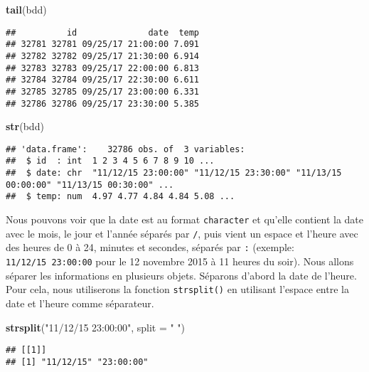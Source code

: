 \documentclass[]{book}
\newenvironment{Shaded}{\begin{snugshade}}{\end{snugshade}}
\newcommand{\KeywordTok}[1]{\textcolor[rgb]{0.13,0.29,0.53}{\textbf{#1}}}
\newcommand{\DataTypeTok}[1]{\textcolor[rgb]{0.13,0.29,0.53}{#1}}
\newcommand{\StringTok}[1]{\textcolor[rgb]{0.31,0.60,0.02}{#1}}
\newcommand{\NormalTok}[1]{#1}
\theoremstyle{definition}
\theoremstyle{definition}
\theoremstyle{definition}
\theoremstyle{remark}
\begin{document}
\begin{Shaded}
\begin{Highlighting}[]
\KeywordTok{tail}\NormalTok{(bdd)}
\end{Highlighting}
\end{Shaded}

\begin{verbatim}
##          id              date  temp
## 32781 32781 09/25/17 21:00:00 7.091
## 32782 32782 09/25/17 21:30:00 6.914
## 32783 32783 09/25/17 22:00:00 6.813
## 32784 32784 09/25/17 22:30:00 6.611
## 32785 32785 09/25/17 23:00:00 6.331
## 32786 32786 09/25/17 23:30:00 5.385
\end{verbatim}

\begin{Shaded}
\begin{Highlighting}[]
\KeywordTok{str}\NormalTok{(bdd)}
\end{Highlighting}
\end{Shaded}

\begin{verbatim}
## 'data.frame':    32786 obs. of  3 variables:
##  $ id  : int  1 2 3 4 5 6 7 8 9 10 ...
##  $ date: chr  "11/12/15 23:00:00" "11/12/15 23:30:00" "11/13/15 00:00:00" "11/13/15 00:30:00" ...
##  $ temp: num  4.97 4.77 4.84 4.84 5.08 ...
\end{verbatim}

Nous pouvons voir que la date est au format \texttt{character} et
qu'elle contient la date avec le mois, le jour et l'année séparés par
\texttt{/}, puis vient un espace et l'heure avec des heures de 0 à 24,
minutes et secondes, séparés par \texttt{:} (exemple:
\texttt{11/12/15\ 23:00:00} pour le 12 novembre 2015 à 11 heures du
soir). Nous allons séparer les informations en plusieurs objets.
Séparons d'abord la date de l'heure. Pour cela, nous utiliserons la
fonction \texttt{strsplit()} en utilisant l'espace entre la date et
l'heure comme séparateur.

\begin{Shaded}
\begin{Highlighting}[]
\KeywordTok{strsplit}\NormalTok{(}\StringTok{"11/12/15 23:00:00"}\NormalTok{, }\DataTypeTok{split =} \StringTok{" "}\NormalTok{)}
\end{Highlighting}
\end{Shaded}

\begin{verbatim}
## [[1]]
## [1] "11/12/15" "23:00:00"
\end{verbatim}
\end{document}
